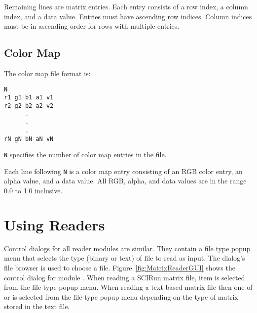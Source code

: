 Remaining lines are matrix entries.  Each entry consists of a row
index, a column index, and a data value.  Entries must have ascending
row indices. Column indices must be in ascending order for rows with
multiple entries.

\subsection{Color Map}
\label{sec:colormap_fmt}

The color map file format is:

\begin{verbatim}
N
r1 g1 b1 a1 v1
r2 g2 b2 a2 v2
      .
      .
      .
rN gN bN aN vN
\end{verbatim}


\verb|N| specifies the number of color map entries in the file.

Each line following \verb|N| is a color map entry consisting of an RGB
color entry, an alpha value, and a data value.  All RGB, alpha, and
data values are in the range 0.0 to 1.0 inclusive.


\section{Using Readers}
\label{sec:using_readers}

\newcommand{\MatrixReaderGUI}{%
  \centerline{\texttt{[image: Figures/MatrixReaderGUI.eps.gz]}}
}
\begin{htmlonly}
  \newcommand{\MatrixReaderGUI}{%
    \htmladdimg[alt="MatrixReader Dialog"]{../Figures/MatrixReaderGUI.gif}
  }
\end{htmlonly}

\newcommand{\ReadFieldNet}{%
  \centerline{\texttt{[image: Figures/ReadFieldNet.eps.gz]}}
}
\begin{htmlonly}
  \newcommand{\ReadFieldNet}{%
    \htmladdimg[alt="Network that reads a text-based field"]{../Figures/ReadFieldNet.gif}
  }
\end{htmlonly}

Control dialogs for all reader modules are similar.  They contain a
file type popup menu that selects the type (binary or text) of file to
read as input.  The dialog's file browser is used to choose a file.
Figure~\ref{fig:MatrixReaderGUI} shows the control dialog for module
.  When reading a SCIRun matrix file, item
 is selected from the file
type popup menu.  When reading a text-based matrix file then one of
 or
 is selected from the file type
popup menu depending on the type of matrix stored in the text file.

